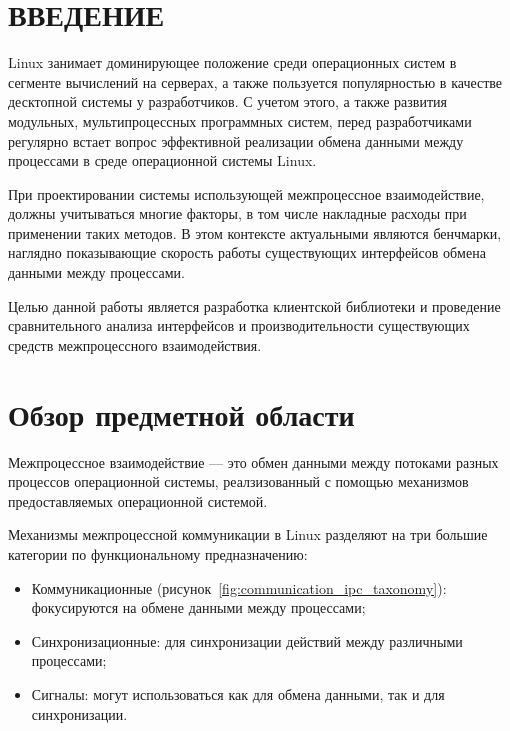 \documentclass[14pt, russian]{scrartcl}
\newcommand{\refImage}[1]{(рисунок~\ref{#1})}
\newcommand{\anonsection}[1]{\cleardoublepage
\phantomsection
\addcontentsline{toc}{section}{\protect\numberline{}#1}
\section*{#1}\vspace*{2.5ex} %
}
\begin{document}

\setlength{\tabcolsep}{3pt}
\newpage
\setcounter{page}{2}

\newpage
\renewcommand\contentsname{\hfill{\normalfont{СОДЕРЖАНИЕ}}\hfill}  %
\tableofcontents
\newpage
\anonsection{ВВЕДЕНИЕ}  %

Linux занимает доминирующее положение среди операционных систем в сегменте
вычислений на серверах\cite{OSMarketShare}, а также пользуется популярностью в
качестве десктопной системы у разработчиков\cite{DevelopersOS}. С учетом этого,
а также развития модульных, мультипроцессных программных систем, перед
разработчиками регулярно встает вопрос эффективной реализации обмена данными
между процессами в среде операционной системы Linux.

При проектировании системы использующей межпроцессное взаимодействие, должны
учитываться многие факторы, в том числе накладные расходы при применении таких
методов. В этом контексте актуальными являются бенчмарки, наглядно показывающие
скорость работы существующих интерфейсов обмена данными между процессами.

Целью данной работы является разработка клиентской библиотеки и проведение
сравнительного анализа интерфейсов и производительности существующих средств
межпроцессного взаимодействия.

\section{Обзор предметной области}

Межпроцессное взаимодействие --- это обмен данными между потоками разных
процессов операционной системы, реалзизованный с помощью механизмов
предоставляемых операционной системой.

Механизмы межпроцессной коммуникации в Linux разделяют на три большие категории
по функциональному предназначению:\cite{kerrisk2010linux}

\begin{itemize}
  \item Коммуникационные \refImage{fig:communication_ipc_taxonomy}: фокусируются на
        обмене данными между процессами;
  \item Синхронизационные: для синхронизации действий между различными
        процессами;
  \item Сигналы: могут использоваться как для обмена данными, так и для
        синхронизации.
\end{itemize}
\end{document}
